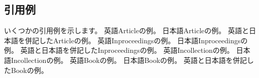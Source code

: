 \documentclass[11pt, a4paper, dvipdfmx, uplatex]{jsarticle}
\begin{document}
\subsection{引用例}

いくつかの引用例を示します。
英語Articleの例\cite{enArticle1}。
日本語Articleの例\cite{jpArticle1}。
英語と日本語を併記したArticleの例\cite{enArticle2/ej/jpArticle2,enArticle3/ej/jpArticle3}。
英語Inproceedingsの例\cite{enInproceedings1}。
日本語Inproceedingsの例\cite{jpInproceedings1}。
英語と日本語を併記したInproceedingsの例\cite{enInproceedings2/ej/jpInproceedings2}。
英語Incollectionの例\cite{enIncollection1}。
日本語Incollectionの例\cite{jpIncollection1,jpIncollection2}。
英語Bookの例\cite{enBook1}。
日本語Bookの例\cite{jpBook1,jpBook2,jpBook3}。
英語と日本語を併記したBookの例\cite{enjBook1/ej/jpjBook1}。


\end{document}
